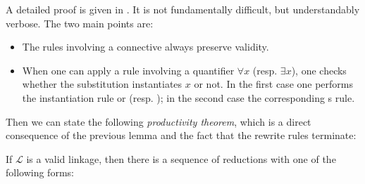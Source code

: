 A detailed proof is given in . It is not fundamentally
difficult, but understandably verbose. The two main points are:
\begin{itemize}
\item The rules involving a connective always preserve validity.
\item When one can apply a rule involving a quantifier $\forall x$ (resp.
  $\exists x$), one checks whether the substitution instantiates $x$ or not. In
  the first case one performs the instantiation rule  or
   (resp. ); in the second case the
  corresponding \textsf{s} rule.
\end{itemize}


Then we can state the following \emph{productivity theorem}, which is a direct
consequence of the previous lemma and the fact that the rewrite rules
terminate:

\begin{theorem}[Productivity]\label{thm:productivity}
If $\mathcal{L}$ is a valid linkage, then there
is a sequence of reductions with one of the following forms:
\end{theorem}



